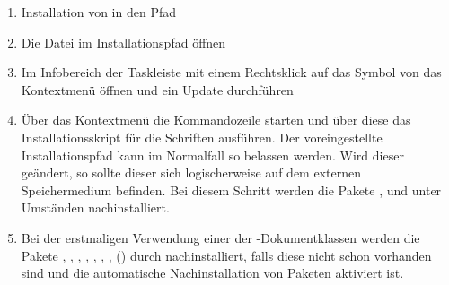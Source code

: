 \begin{enumerate}
\item Installation von  in den Pfad
\item Die Datei  im Installationspfad öffnen
\item Im Infobereich der Taskleiste mit einem Rechtsklick auf das Symbol von  
   das Kontextmenü öffnen und ein Update 
  durchführen
\item Über das Kontextmenü die Kommandozeile starten und über diese das 
  Installationsskript für die Schriften  
  ausführen. Der voreingestellte Installationspfad kann im Normalfall so 
  belassen werden. Wird dieser geändert, so sollte dieser sich logischerweise 
  auf dem externen Speichermedium befinden. Bei diesem Schritt werden die 
  Pakete ,  und  unter 
  Umständen nachinstalliert.
\item Bei der erstmaligen Verwendung einer der \TUDScript-Dokumentklassen 
  werden die Pakete , , 
  , , , 
  , , () durch 
   nachinstalliert, falls diese nicht 
  schon vorhanden sind und die automatische Nachinstallation von Paketen 
  aktiviert ist.
\end{enumerate}
